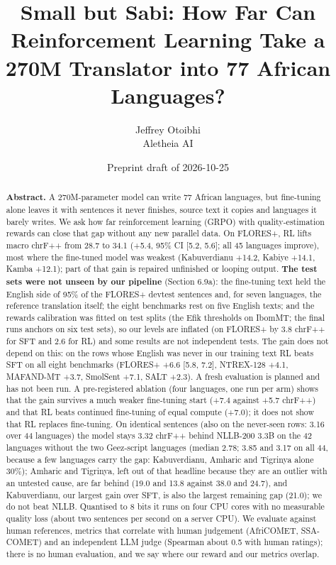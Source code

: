 \documentclass[11pt,a4paper]{article}
\title{Small but Sabi: How Far Can Reinforcement Learning Take a 270M Translator into 77 African Languages?}
\author{Jeffrey Otoibhi\\ Aletheia AI}
\date{Preprint draft of 2026-10-25}
\begin{document}
\maketitle
\begin{abstract}
\noindent
\textbf{Abstract.} A 270M-parameter model can write 77 African languages, but fine-tuning alone leaves it with sentences it never finishes, source text it copies and languages it barely writes. We ask how far reinforcement learning (GRPO) with quality-estimation rewards can close that gap without any new parallel data. On FLORES+, RL lifts macro chrF++ from 28.7 to 34.1 (+5.4, 95\% CI {[}5.2, 5.6{]}; all 45 languages improve), most where the fine-tuned model was weakest (Kabuverdianu +14.2, Kabiye +14.1, Kamba +12.1); part of that gain is repaired unfinished or looping output. \textbf{The test sets were not unseen by our pipeline} (Section 6.9a): the fine-tuning text held the English side of 95\% of the FLORES+ devtest sentences and, for seven languages, the reference translation itself; the eight benchmarks rest on five English texts; and the reward\textquotesingle s calibration was fitted on test splits (the Efik thresholds on IbomMT; the final run\textquotesingle s anchors on six test sets), so our levels are inflated (on FLORES+ by 3.8 chrF++ for SFT and 2.6 for RL) and some results are not independent tests. The gain does not depend on this: on the rows whose English was never in our training text RL beats SFT on all eight benchmarks (FLORES+ +6.6 {[}5.8, 7.2{]}, NTREX-128 +4.1, MAFAND-MT +3.7, SmolSent +7.1, SALT +2.3). A fresh evaluation is planned and has not been run. A pre-registered ablation (four languages, one run per arm) shows that the gain survives a much weaker fine-tuning start (+7.4 against +5.7 chrF++) and that RL beats continued fine-tuning of equal compute (+7.0); it does not show that RL replaces fine-tuning. On identical sentences (also on the never-seen rows: 3.16 over 44 languages) the model stays 3.32 chrF++ behind NLLB-200 3.3B on the 42 languages without the two Ge\textquotesingle ez-script languages (median 2.78; 3.85 and 3.17 on all 44, because a few languages carry the gap: Kabuverdianu, Amharic and Tigrinya alone 30\%); Amharic and Tigrinya, left out of that headline because they are an outlier with an untested cause, are far behind (19.0 and 13.8 against 38.0 and 24.7), and Kabuverdianu, our largest gain over SFT, is also the largest remaining gap (21.0); we do not beat NLLB. Quantised to 8 bits it runs on four CPU cores with no measurable quality loss (about two sentences per second on a server CPU). We evaluate against human references, metrics that correlate with human judgement (AfriCOMET, SSA-COMET) and an independent LLM judge (Spearman about 0.5 with human ratings); there is no human evaluation, and we say where our reward and our metrics overlap.
\end{abstract}





\end{document}
